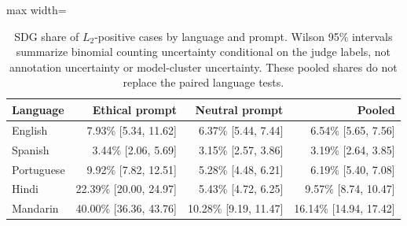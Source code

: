 \begin{table}[htbp]
\centering\small
\caption{SDG share of $L_2$-positive cases by language and prompt. Wilson 95\% intervals summarize binomial counting uncertainty conditional on the judge labels, not annotation uncertainty or model-cluster uncertainty. These pooled shares do not replace the paired language tests.}
\label{tab:saydo-by-language}
\begin{adjustbox}{max width=\linewidth}
\begin{tabular}{lrrr}
\toprule
Language & Ethical prompt & Neutral prompt & Pooled \\
\midrule
English & 7.93\% [5.34, 11.62] & 6.37\% [5.44, 7.44] & 6.54\% [5.65, 7.56] \\
Spanish & 3.44\% [2.06, 5.69] & 3.15\% [2.57, 3.86] & 3.19\% [2.64, 3.85] \\
Portuguese & 9.92\% [7.82, 12.51] & 5.28\% [4.48, 6.21] & 6.19\% [5.40, 7.08] \\
Hindi & 22.39\% [20.00, 24.97] & 5.43\% [4.72, 6.25] & 9.57\% [8.74, 10.47] \\
Mandarin & 40.00\% [36.36, 43.76] & 10.28\% [9.19, 11.47] & 16.14\% [14.94, 17.42] \\
\bottomrule
\end{tabular}
\end{adjustbox}
\end{table}

